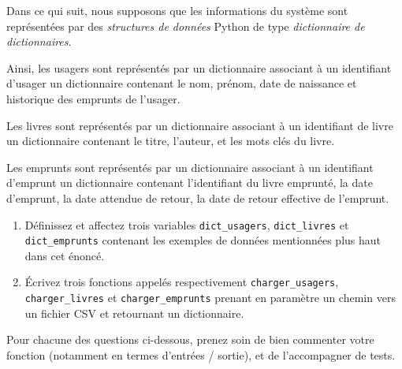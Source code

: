 \documentclass[10pt,a4paper]{sujets-exercices}
\begin{document}
Dans ce qui suit, nous supposons que les informations du système sont représentées par des \emph{structures de données} Python de type \emph{dictionnaire de dictionnaires}.

Ainsi, les usagers sont représentés par un dictionnaire associant à un identifiant d'usager un dictionnaire contenant le nom, prénom, date de naissance et historique des emprunts de l'usager.

Les livres sont représentés par un dictionnaire associant à un identifiant de livre un dictionnaire contenant le titre, l'auteur, et les mots clés du livre.

Les emprunts sont représentés par un dictionnaire associant à un identifiant d'emprunt un dictionnaire contenant l'identifiant du livre emprunté, la date d'emprunt, la date attendue de retour, la date de retour effective de l'emprunt.

\begin{enumerate}
\item Définissez et affectez trois variables \texttt{dict\_usagers}, \texttt{dict\_livres} et \texttt{dict\_emprunts} contenant les exemples de données mentionnées plus haut dans cet énoncé.
\item Écrivez trois fonctions appelés respectivement \texttt{charger\_usagers}, \texttt{charger\_livres} et \texttt{charger\_emprunts} prenant en paramètre un chemin vers un fichier CSV et retournant un dictionnaire.
\end{enumerate}


Pour chacune des questions ci-dessous, prenez soin de bien commenter votre fonction (notamment en termes d'entrées / sortie), et de l'accompagner de tests.
\end{document}
